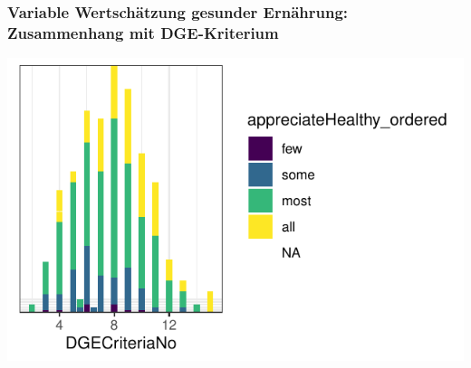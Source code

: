 \begin{frame}[fragile]
\frametitle{Variable \glqq Wertschätzung gesunder Ernährung\grqq: Zusammenhang mit DGE-Kriterium}
\begin{knitrout}\footnotesize
{}\color{fgcolor}

{\centering \includegraphics[width=\maxwidth]{figure/beamer-appreciateDGEplot-1} 

}



\end{knitrout}
\end{frame}

